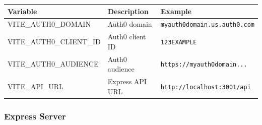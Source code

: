 \documentclass{article}
\begin{document}
\begin{tabularx}{\textwidth}{lXl}
\toprule
\textbf{Variable} & \textbf{Description} & \textbf{Example} \\
\midrule
VITE\_AUTH0\_DOMAIN & Auth0 domain & \texttt{myauth0domain.us.auth0.com} \\
VITE\_AUTH0\_CLIENT\_ID & Auth0 client ID & \texttt{123EXAMPLE} \\
VITE\_AUTH0\_AUDIENCE & Auth0 audience & \texttt{https://myauth0domain...} \\
VITE\_API\_URL & Express API URL & \texttt{http://localhost:3001/api} \\
\bottomrule
\end{tabularx}

\subsubsection*{Express Server}
\end{document}
